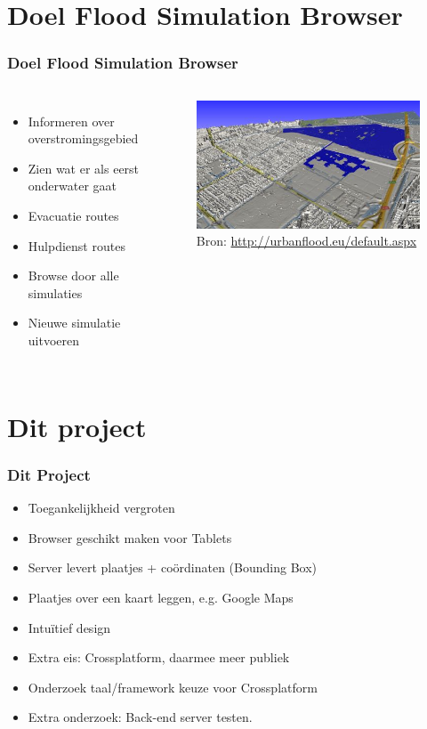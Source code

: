 \documentclass[10pt,a4paper]{beamer}
\begin{document}
\section{Doel Flood Simulation Browser}
\begin{frame}
\frametitle{Doel Flood Simulation Browser}
\begin{columns}[c]
\column{5cm}
\begin{itemize}
\item Informeren over overstromingsgebied
\item Zien wat er als eerst onderwater gaat
\item Evacuatie routes
\item Hulpdienst routes
\item Browse door alle simulaties
\item Nieuwe simulatie uitvoeren
\end{itemize}
\column{5cm}
\begin{figure}
\includegraphics[scale=0.5]{simulation.png}
\caption{Bron: \url{http://urbanflood.eu/default.aspx}}
\end{figure}
\end{columns}
\end{frame}
\section{Dit project}
\begin{frame}
\frametitle{Dit Project}
\begin{itemize}
\item Toegankelijkheid vergroten
\item Browser geschikt maken voor Tablets
\item Server levert plaatjes + coördinaten (Bounding Box)
\item Plaatjes over een kaart leggen, e.g. Google Maps
\item Intuïtief design
\item Extra eis: Crossplatform, daarmee meer publiek
\item Onderzoek taal/framework keuze voor Crossplatform
\item Extra onderzoek: Back-end server testen.
\end{itemize}
\end{frame}
\end{document}

